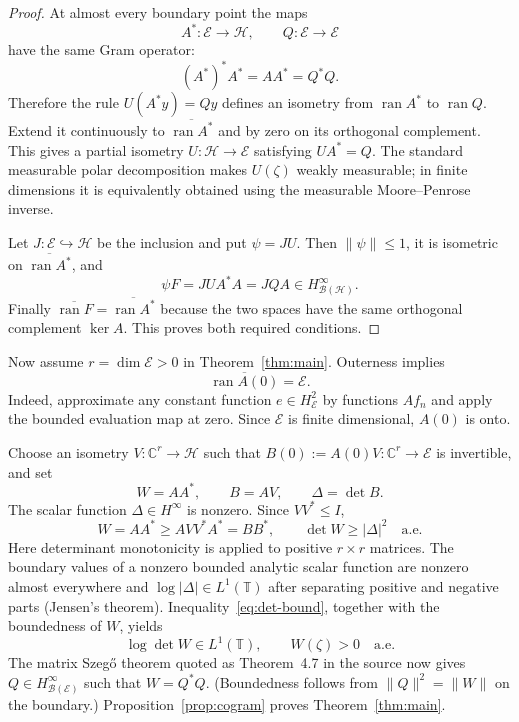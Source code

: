 \documentclass[11pt]{article}
\theoremstyle{remark}
\newcommand{\T}{\mathbb T}
\newcommand{\C}{\mathbb C}
\newcommand{\B}{\mathcal B}
\newcommand{\Hh}{\mathcal H}
\newcommand{\Ee}{\mathcal E}
\newcommand{\ran}{\operatorname{ran}}
\begin{document}
\begin{proof}
At almost every boundary point the maps
\[
 A^*:\Ee\longrightarrow\Hh,
 \qquad Q:\Ee\longrightarrow\Ee
\]
have the same Gram operator:
\[
 (A^*)^*A^*=AA^*=Q^*Q.
\]
Therefore the rule $U(A^*y)=Qy$ defines an isometry from $\ran A^*$ to
$\ran Q$.  Extend it continuously to $\overline{\ran A^*}$ and by zero on
its orthogonal complement.  This gives a partial isometry
$U:\Hh\to\Ee$ satisfying $UA^*=Q$.  The standard measurable polar
decomposition makes $U(\zeta)$ weakly measurable; in finite dimensions it
is equivalently obtained using the measurable Moore--Penrose inverse.

Let $J:\Ee\hookrightarrow\Hh$ be the inclusion and put $\psi=JU$.  Then
$\|\psi\|\le1$, it is isometric on $\overline{\ran A^*}$, and
\[
 \psi F=JUA^*A=JQA\in H^\infty_{\B(\Hh)}.
\]
Finally
$\overline{\ran F}=\overline{\ran A^*}$ because the two spaces have the
same orthogonal complement $\ker A$.  This proves both required conditions.
\end{proof}

Now assume $r=\dim\Ee>0$ in Theorem~\ref{thm:main}.  Outerness implies
\begin{equation}\label{eq:zero-range}
 \overline{\ran A(0)}=\Ee.
\end{equation}
Indeed, approximate any constant function $e\in H^2_\Ee$ by functions
$Af_n$ and apply the bounded evaluation map at zero.  Since $\Ee$ is finite
dimensional, $A(0)$ is onto.

Choose an isometry $V:\C^r\to\Hh$ such that
$B(0):=A(0)V:\C^r\to\Ee$ is invertible, and set
\[
 W=AA^*,\qquad B=AV,\qquad \Delta=\det B.
\]
The scalar function $\Delta\in H^\infty$ is nonzero.  Since $VV^*\le I$,
\begin{equation}\label{eq:det-bound}
 W=AA^*\ge AVV^*A^*=BB^*,
 \qquad \det W\ge |\Delta|^2\quad\text{a.e.}
\end{equation}
Here determinant monotonicity is applied to positive $r\times r$ matrices.
The boundary values of a nonzero bounded analytic scalar function are
nonzero almost everywhere and $\log|\Delta|\in L^1(\T)$ after separating
positive and negative parts (Jensen's theorem).  Inequality~\eqref{eq:det-bound}, together
with the boundedness of $W$, yields
\[
 \log\det W\in L^1(\T),
 \qquad W(\zeta)>0\quad\text{a.e.}
\]
The matrix Szeg\H{o} theorem quoted as Theorem~4.7 in the source now gives
$Q\in H^\infty_{\B(\Ee)}$ such that $W=Q^*Q$.  (Boundedness follows from
$\|Q\|^2=\|W\|$ on the boundary.)  Proposition~\ref{prop:cogram} proves
Theorem~\ref{thm:main}.
\end{document}
